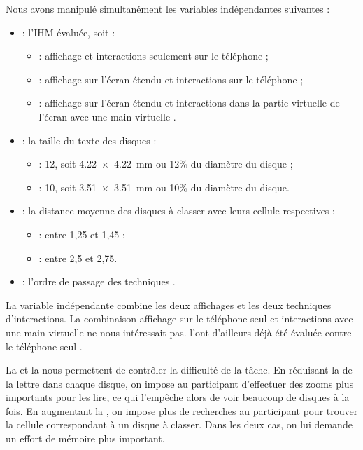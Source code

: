 Nous avons manipulé simultanément les variables indépendantes suivantes :
\begin{itemize}
  \item {} : l'IHM évaluée, soit :
  \begin{itemize}
    \item {} : affichage et interactions seulement sur le téléphone  ;
    \item {} : affichage sur l'écran étendu et interactions sur le téléphone  ;
    \item {} : affichage sur l'écran étendu et interactions dans la partie virtuelle de l'écran avec une main virtuelle .
  \end{itemize}
  \item {} : la taille du texte des disques :
  \begin{itemize}
    \item {} : \SI{12}{\pt}, soit \SI{4.22x4.22}{\mm} ou 12\% du diamètre du disque ;
    \item {} : \SI{10}{\pt}, soit \SI{3.51x3.51}{\mm} ou 10\% du diamètre du disque.
  \end{itemize}
  \item {} : la distance moyenne des disques à classer avec leurs cellule respectives :
  \begin{itemize}
    \item {} : entre 1,25 et 1,45 ;
    \item {} : entre 2,5 et 2,75.
  \end{itemize}
  \item {} : l'ordre de passage des techniques .
\end{itemize}
\medskip

La variable indépendante  combine les deux affichages et les deux techniques d'interactions. La combinaison affichage sur le téléphone seul et interactions avec une main virtuelle ne nous intéressait pas. \cite{Jones2012} l'ont d'ailleurs déjà été évaluée contre le téléphone seul .

La  et la  nous permettent de contrôler la difficulté de la tâche. En réduisant la  de la lettre dans chaque disque, on impose au participant d'effectuer des zooms plus importants pour les lire, ce qui l'empêche alors de voir beaucoup de disques à la fois. En augmentant la , on impose plus de recherches au participant pour trouver la cellule correspondant à un disque à classer. Dans les deux cas, on lui demande un effort de mémoire plus important.

